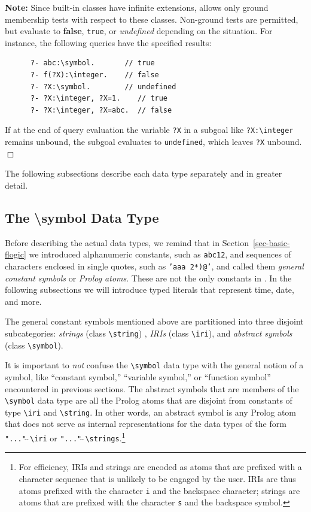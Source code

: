 \documentclass[11pt]{article}
\newcommand{\ERGO}{\mbox{\smaller{\ensuremath{\cal{E}}\smaller{{\sc{RGO}}}}}\xspace}
\newcommand{\FLSYSTEM}{\ERGO}
\newcommand{\bs}{\textbackslash}
\begin{document}
\noindent
{\bf Note:} Since built-in classes have infinite extensions, \FLSYSTEM
allows only
ground membership tests with respect to these classes. Non-ground tests are
permitted, but evaluate to {\bf false}, \texttt{true}, or \emph{undefined} 
depending on the
situation. For instance, the following
queries have the specified results:
\begin{verbatim}
      ?- abc:\symbol.       // true
      ?- f(?X):\integer.    // false
      ?- ?X:\symbol.        // undefined
      ?- ?X:\integer, ?X=1.    // true
      ?- ?X:\integer, ?X=abc.  // false
\end{verbatim}
If at the end of query evaluation the variable \texttt{?X} in a subgoal like
\texttt{?X:\bs{}integer} remains
unbound, the subgoal evaluates to \texttt{undefined}, which
leaves \texttt{?X} unbound.
\hfill$\Box$

The following subsections
describe each data type separately and in greater detail.

\subsection{The \bs{}symbol Data Type}

\index{datatype!\bs{}symbol}
Before describing the actual data types, we remind that
in Section~\ref{sec-basic-flogic} we introduced
alphanumeric constants, such as {\tt abc12}, and sequences of characters
enclosed in single quotes, such as {\tt 'aaa 2*)@'},  and called them
\emph{general constant symbols} or \emph{Prolog atoms}. These are not the
only constants in \FLSYSTEM.
In the following subsections we will introduce typed literals that
represent time, date, and more.

\index{class!\bs{}symbol}
The general constant symbols mentioned above are partitioned into three
disjoint subcategories:
\emph{strings} (class \texttt{\bs{}string}) , \emph{IRIs} (class
\texttt{\bs{}iri}), and \emph{abstract symbols} (class \texttt{\bs{}symbol}). 

It is important to
\emph{not} confuse the \texttt{\bs{}symbol} data type with the general
notion of a symbol, like ``constant symbol,''  ``variable symbol,'' or
``function symbol'' encountered in previous sections.
The abstract symbols that are members of the \texttt{\bs{}symbol} data type
are all the Prolog atoms that
are disjoint from constants of type \texttt{\bs{}iri} and
\texttt{\bs{}string}. In other words, an abstract symbol is any Prolog atom
that does not   
serve as internal representations for the data types
of the form \texttt{"..."$\hat{~}\hat{~}$\bs{}iri} or
\texttt{"..."$\hat{~}\hat{~}$\bs{}strings}.\footnote{
  For efficiency, IRIs and strings are encoded as atoms that are prefixed
  with a character sequence that is unlikely to be engaged by the user.
  IRIs are thus atoms prefixed
  with the character \texttt{i} and the backspace character; strings are atoms
  that are prefixed with the character
  \texttt{s} and the backspace symbol.
  }
\end{document}
